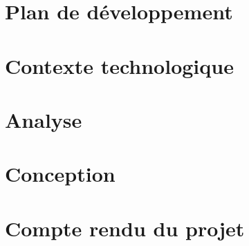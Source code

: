 \section{Plan de d\'eveloppement}
\label{sec:plan:devt}


\clearpage
\section{Contexte technologique}
\label{sec:contexte-techno}


\clearpage

\section{Analyse}
\label{sec:etat-avancement}

\clearpage

\section{Conception}
\label{sec:etat-avancement}

\clearpage

%

\section{Compte rendu du projet}
\label{sec:compterendu}

\clearpage

